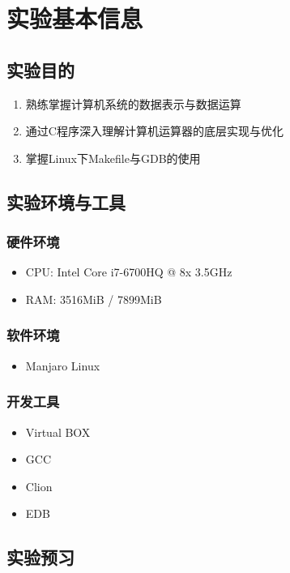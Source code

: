 \section{实验基本信息}

\subsection{实验目的}
\begin{enumerate}
    \item 熟练掌握计算机系统的数据表示与数据运算
    \item 通过C程序深入理解计算机运算器的底层实现与优化
    \item 掌握Linux下Makefile与GDB的使用
\end{enumerate}

\subsection{实验环境与工具}

\subsubsection{硬件环境}
\begin{itemize}
    \item CPU: Intel Core i7-6700HQ @ 8x 3.5GHz
    \item RAM: 3516MiB / 7899MiB
\end{itemize}

\subsubsection{软件环境}
\begin{itemize}
    \item Manjaro Linux

\end{itemize}

\subsubsection{开发工具}
\begin{itemize}
    \item Virtual BOX
    \item GCC
    \item Clion
    \item EDB
\end{itemize}

\subsection{实验预习}
